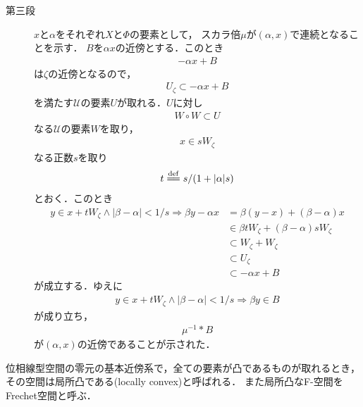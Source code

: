 \begin{sketch}
\begin{description}
			\item[第三段]
				$x$と$\alpha$をそれぞれ$X$と$\Phi$の要素として，
				スカラ倍$\mu$が$(\alpha,x)$で連続となることを示す．
				$B$を$\alpha x$の近傍とする．このとき
				\begin{align}
					-\alpha x + B
				\end{align}
				は$\zeta$の近傍となるので，
				\begin{align}
					U_\zeta \subset -\alpha x + B 
				\end{align}
				を満たす$\mathscr{U}$の要素$U$が取れる．$U$に対し
				\begin{align}
					W \circ W \subset U
				\end{align}
				なる$\mathscr{U}$の要素$W$を取り，
				\begin{align}
					x \in s W_\zeta
				\end{align}
				なる正数$s$を取り
				\begin{align}
					t \defeq s/(1+|\alpha|s)
				\end{align}
				とおく．このとき
				\begin{align}
					y \in x+t W_\zeta \wedge |\beta - \alpha| < 1/s
					\Longrightarrow \beta y - \alpha x
					&= \beta (y-x) + (\beta - \alpha)x \\
					&\in \beta t W_\zeta + (\beta - \alpha) s W_\zeta \\
					&\subset W_\zeta + W_\zeta \\
					&\subset U_\zeta \\
					&\subset -\alpha x + B
				\end{align}
				が成立する．ゆえに
				\begin{align}
					y \in x+t W_\zeta \wedge |\beta - \alpha| < 1/s
					\Longrightarrow \beta y \in B
				\end{align}
				が成り立ち，
				\begin{align}
					\mu^{-1} \ast B
				\end{align}
				が$(\alpha,x)$の近傍であることが示された．
				
		\end{description}
	\end{sketch}
	
	\begin{screen}
		\begin{dfn}
			位相線型空間の零元の基本近傍系で，全ての要素が凸であるものが取れるとき，
			その空間は局所凸である(locally convex)と呼ばれる．
			また局所凸なF-空間をFrechet空間と呼ぶ．
		\end{dfn}
	\end{screen}
	
	\begin{screen}
		\begin{thm}[局所凸空間とはセミノルムの族で生成される空間]
			
		\end{thm}
	\end{screen}